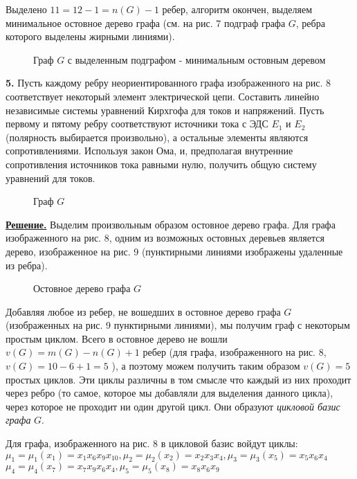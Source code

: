 \documentclass[12pt, letterpaper, titlepage]{article}
\begin{document}
Выделено $11 = 12-1 = n(G)-1$ ребер, алгоритм окончен, выделяем минимальное остовное дерево графа (см. на рис. 7 подграф графа $G$, ребра которого выделены жирными линиями).
\begin{figure}[H]\centering\caption{Граф $G$ с выделенным подграфом - минимальным остовным деревом}\end{figure}
\textbf{5.} Пусть каждому ребру неориентированного графа
изображенного на рис. 8 соответствует некоторый элемент электрической цепи.
Составить линейно независимые системы уравнений Кирхгофа для токов и напряжений.
Пусть первому и пятому ребру соответствуют источники тока с ЭДС $E_1$ и $E_2$ (полярность
выбирается произвольно), а остальные элементы являются сопротивлениями. Используя
закон Ома, и, предполагая внутренние сопротивления источников тока равными нулю,
получить общую систему уравнений для токов.
\begin{figure}[H]\centering\caption{Граф $G$}\end{figure}
\underline{\textbf{Решение.}}
Выделим произвольным образом остовное дерево графа. Для графа изображенного на рис. 8, одним из возможных
остовных деревьев является дерево, изображенное на рис. 9 (пунктирными линиями
изображены удаленные из ребра).
\begin{figure}[H]\centering\caption{Остовное дерево графа $G$}\end{figure}
Добавляя любое из ребер, не вошедших в остовное дерево графа $G$ (изображенных
на рис. 9 пунктирными линиями), мы получим граф с некоторым простым циклом. Всего в остовное дерево не вошли
$v(G)=m(G)-n(G)+1$ ребер (для графа, изображенного на рис. 8, $v(G)=10-6+1=5$ ), а поэтому можем
получить таким образом $v(G)=5$ простых циклов. Эти циклы различны в том смысле что
каждый из них проходит через ребро (то самое, которое мы добавляли для выделения
данного цикла), через которое не проходит ни один другой цикл. Они образуют \emph{цикловой
базис графа} $G$.

Для графа, изображенного на рис. 8 в цикловой базис войдут циклы:\\
$\mu_1 = \mu_1(x_1)=x_1x_6x_9x_{10}, \mu_2 = \mu_2(x_2)=x_2x_3x_4,\mu_3=\mu_3(x_5)=x_5x_6x_4$\\
$\mu_4 = \mu_4(x_7)=x_7x_9x_6x_4, \mu_5=\mu_5(x_8)=x_8x_6x_9$
\end{document}
